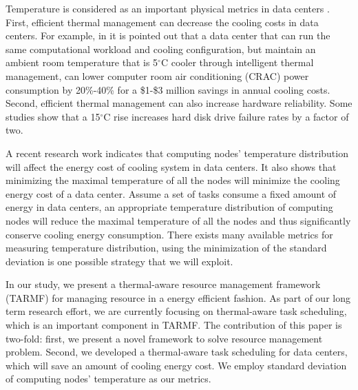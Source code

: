 Temperature is considered as an important physical metrics in data centers \cite{hamann2008mat}. First, efficient thermal management can decrease the cooling costs in data centers. For example, in \cite{DBLP:conf/usenix/MooreCRS05} it is pointed out that a data center that can run the same computational workload and cooling configuration, but maintain an ambient room temperature that is 5$^\circ$C cooler through intelligent thermal management, can lower computer room air conditioning (CRAC) power consumption by 20\%-40\% for a \$1-\$3 million savings in annual cooling costs. Second, efficient thermal management can also increase hardware reliability. Some studies \cite{DBLP:conf/fast/AndersonDR03, cole2000edr} show that a 15$^\circ$C rise increases hard disk drive failure rates by a factor of two. 

A recent research work \cite{DBLP:conf/cluster/TangGV07} indicates that computing nodes' temperature distribution will affect the energy cost of cooling system in data centers. It also shows that minimizing the maximal temperature of all the nodes will minimize the cooling energy cost of a data center. Assume a set of tasks consume a fixed amount of energy in data centers, an appropriate temperature distribution of computing nodes will reduce the maximal temperature of all the nodes and thus significantly conserve cooling energy consumption. There exists many available metrics for measuring temperature distribution, using the minimization of the standard deviation is one possible strategy that we will exploit.

\begin{comment}
In this paper we use standard deviation \cite{www-sd} to describe computing nodes' thermal distribution. Computing nodes' temperature standard deviation is the measure of how the computing nodes' temperature is close to their average value. A low standard deviation indicates that every computing node' temperature value tends to very close to the average value. A high standard deviation indicated that the temperature values in the computing nodes are distributed in a large range. Therefore, assume the same energy in data centers is needed to execute the same set of tasks, the goal of the efficient thermal management is to balance the thermal distribution on each node and make the computing nodes' temperature standard deviation as low as possible so that         
\end{comment}

In our study, we present a thermal-aware resource management framework (TARMF) for managing resource in a energy efficient fashion. As part of our long term research effort, we are currently focusing on thermal-aware task scheduling, which is an important component in TARMF. The contribution of this paper is two-fold: first, we present a novel framework to solve resource management problem. Second, we developed a thermal-aware task scheduling for data centers, which will save an amount of cooling energy cost. We employ standard deviation of computing nodes' temperature as our metrics.  


